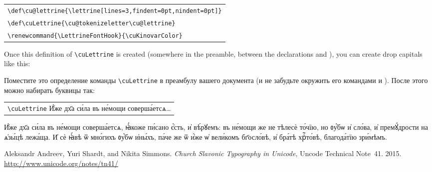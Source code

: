 \begin{center}
\begin{churchslavonic}
\begin{tabular}{l}
\verb+\def\cu@lettrine{\lettrine[lines=3,findent=0pt,nindent=0pt]}+\\
\verb+\def\cuLettrine{\cu@tokenizeletter\cu@lettrine}+\\
\verb+\renewcommand{\LettrineFontHook}{\cuKinovarColor}+\\
\end{tabular}
\end{churchslavonic}
\end{center}
%
\begin{EN}
Once this definition of \verb+\cuLettrine+ is created (somewhere in the preamble, between the declarations  and ),
you can create drop capitals like this:
\end{EN}
%
\begin{RU}
Поместите это определение команды \verb+\cuLettrine+ в преамбулу вашего документа (и не забудьте окружить его командами  и ).
После этого можно набирать буквицы так:
\end{RU}
%
\begin{center}
\begin{churchslavonic}
\begin{tabular}{l}
\verb+\cuLettrine+ И҆́же дх҃а си́ла въ не́мощи соверша́етсѧ\ldots\\
\end{tabular}
\end{churchslavonic}
\end{center}

\begin{center}
\begin{churchslavonic}

\parbox{0.75\textwidth}{%
\textwidth

\cuLettrine 
И҆́же дх҃а си́ла въ не́мощи соверша́етсѧ, ꙗ҆́коже пи́сано є҆́сть, и҆ вѣ́рꙋемъ: въ не́мощи же не тѣлесѐ то́чїю, но ᲂу҆́бѡ и҆ сло́ва, 
и҆ премꙋ́дрости на ѧ҆зы́цѣ лежа́ща. И҆ сѐ ꙗ҆́вѣ ѿ мно́гихъ ᲂу҆́бѡ и҆ны́хъ, па́че же ѿ и҆́же ѡ҆ вели́комъ бг҃осло́вѣ, и҆ бра́тѣ хрⷭ҇то́вѣ, 
благода́тїю зри́мѣмъ.
}%
\end{churchslavonic}
\end{center}

\begin{thebibliography}{9}

  Aleksandr Andreev, Yuri Shardt, and Nikita Simmons.
  \emph{Church Slavonic Typography in Unicode},
  Uncode Technical Note~41. 2015.
  \url{http://www.unicode.org/notes/tn41/}

\end{thebibliography}


